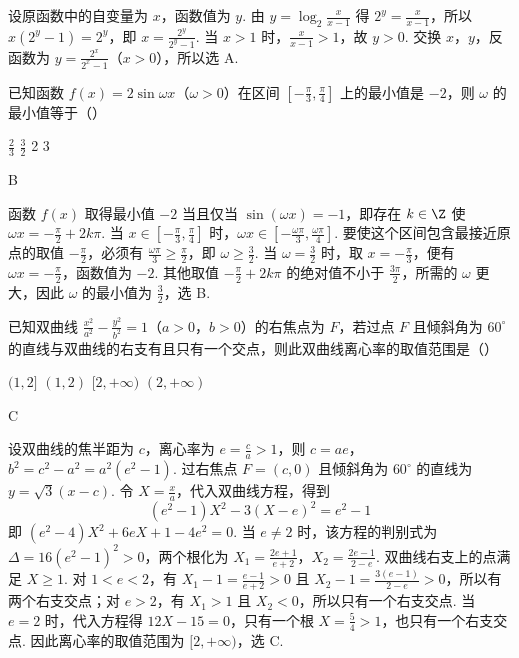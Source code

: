 \begin{solution}
设原函数中的自变量为 \(x\)，函数值为 \(y\). 由 \(y=\log_{2}\frac{x}{x-1}\) 得 \(2^y=\frac{x}{x-1}\)，所以 \(x(2^y-1)=2^y\)，即 \(x=\frac{2^y}{2^y-1}\). 当 \(x>1\) 时，\(\frac{x}{x-1}>1\)，故 \(y>0\). 交换 \(x\)，\(y\)，反函数为 \(y=\frac{2^x}{2^x-1}\)（\(x>0\)），所以选 A.
\end{solution}

\begin{problem}
已知函数 \( f(x) = 2\sin \omega x \)（\(\omega > 0\)）在区间 \(\left[-\frac{\pi}{3}, \frac{\pi}{4}\right]\) 上的最小值是 \(-2\)，则 \(\omega\) 的最小值等于（\quad）

\choices
    {\( \frac{2}{3} \)}
    {\( \frac{3}{2} \)}
    {2}
    {3}
\end{problem}

\begin{answer}
B
\end{answer}

\begin{solution}
函数 \(f(x)\) 取得最小值 \(-2\) 当且仅当 \(\sin(\omega x)=-1\)，即存在 \(k\in\Z\) 使 \(\omega x=-\frac{\pi}{2}+2k\pi\). 当 \(x\in\left[-\frac{\pi}{3},\frac{\pi}{4}\right]\) 时，\(\omega x\in\left[-\frac{\omega\pi}{3},\frac{\omega\pi}{4}\right]\). 要使这个区间包含最接近原点的取值 \(-\frac{\pi}{2}\)，必须有 \(\frac{\omega\pi}{3}\geq\frac{\pi}{2}\)，即 \(\omega\geq\frac{3}{2}\). 当 \(\omega=\frac{3}{2}\) 时，取 \(x=-\frac{\pi}{3}\)，便有 \(\omega x=-\frac{\pi}{2}\)，函数值为 \(-2\). 其他取值 \(-\frac{\pi}{2}+2k\pi\) 的绝对值不小于 \(\frac{3\pi}{2}\)，所需的 \(\omega\) 更大，因此 \(\omega\) 的最小值为 \(\frac{3}{2}\)，选 B.
\end{solution}

\begin{problem}
已知双曲线 \(\frac{x^2}{a^2} - \frac{y^2}{b^2} = 1\)（\(a > 0\)，\(b > 0\)）的右焦点为 \(F\)，若过点 \(F\) 且倾斜角为 \(60^\circ\) 的直线与双曲线的右支有且只有一个交点，则此双曲线离心率的取值范围是（\quad）

\choices
    {\((1,2]\)}
    {\((1,2)\)}
    {\([2, +\infty)\)}
    {\((2, +\infty)\)}
\end{problem}

\begin{answer}
C
\end{answer}

\begin{solution}
设双曲线的焦半距为 \(c\)，离心率为 \(e=\frac{c}{a}>1\)，则 \(c=ae\)，\(b^2=c^2-a^2=a^2(e^2-1)\). 过右焦点 \(F=(c,0)\) 且倾斜角为 \(60^\circ\) 的直线为 \(y=\sqrt{3}(x-c)\). 令 \(X=\frac{x}{a}\)，代入双曲线方程，得到
\[
(e^2-1)X^2-3(X-e)^2=e^2-1
\]
即 \((e^2-4)X^2+6eX+1-4e^2=0\). 当 \(e\ne2\) 时，该方程的判别式为 \(\Delta=16(e^2-1)^2>0\)，两个根化为 \(X_1=\frac{2e+1}{e+2}\)，\(X_2=\frac{2e-1}{2-e}\). 双曲线右支上的点满足 \(X\geq1\). 对 \(1<e<2\)，有 \(X_1-1=\frac{e-1}{e+2}>0\) 且 \(X_2-1=\frac{3(e-1)}{2-e}>0\)，所以有两个右支交点；对 \(e>2\)，有 \(X_1>1\) 且 \(X_2<0\)，所以只有一个右支交点. 当 \(e=2\) 时，代入方程得 \(12X-15=0\)，只有一个根 \(X=\frac{5}{4}>1\)，也只有一个右支交点. 因此离心率的取值范围为 \([2,+\infty)\)，选 C.
\end{solution}

